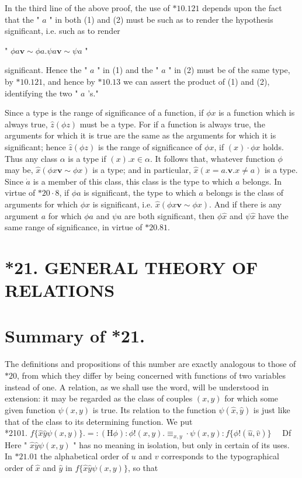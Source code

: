\documentclass[10pt]{article}
\begin{document}
In the third line of the above proof, the use of $* 10.121$ depends upon the fact that the " $a$ " in both (1) and (2) must be such as to render the hypothesis significant, i.e. such as to render

\begin{displayquote}
" $\phi a \mathbf{v} \sim \phi a . \psi a \mathbf{v} \sim \psi a$ "
\end{displayquote}

significant. Hence the " $a$ " in (1) and the " $a$ " in (2) must be of the same type, by $* 10.121$, and hence by $* 10.13$ we can assert the product of (1) and (2), identifying the two " $a$ 's."

Since a type is the range of significance of a function, if $\phi x$ is a function which is always true, $\hat{z}(\phi z)$ must be a type. For if a function is always true, the arguments for which it is true are the same as the arguments for which it is significant; hence $\hat{z}(\phi z)$ is the range of significance of $\phi x$, if $(x) \cdot \phi x$ holds. Thus any class $\alpha$ is a type if $(x) . x \in \alpha$. It follows that, whatever function $\phi$ may be, $\hat{x}(\phi x \mathbf{v} \sim \phi x)$ is a type; and in particular, $\hat{x}(x=a . \mathbf{v} . x \neq a)$ is a type. Since $\dot{a}$ is a member of this class, this class is the type to which $a$ belongs. In virtue of $* 20 \cdot 8$, if $\phi a$ is significant, the type to which $a$ belongs is the class of arguments for which $\phi x$ is significant, i.e. $\hat{x}(\phi x \mathbf{v} \sim \phi x)$. And if there is any argument $a$ for which $\phi a$ and $\psi a$ are both significant, then $\phi \hat{x}$ and $\psi \hat{x}$ have the same range of significance, in virtue of $* 20.81$.

\section*{*21. GENERAL THEORY OF RELATIONS}
\section*{Summary of *21.}
The definitions and propositions of this number are exactly analogous to those of $* 20$, from which they differ by being concerned with functions of two variables instead of one. A relation, as we shall use the word, will be understood in extension: it may be regarded as the class of couples $(x, y)$ for which some given function $\psi(x, y)$ is true. Its relation to the function $\psi(\hat{x}, \hat{y})$ is just like that of the class to its determining function. We put\\
*2101. $f\{\hat{x} \hat{y} \psi(x, y)\} .=:(\mathrm{H} \phi): \phi!(x, y) . \equiv_{x, y} \cdot \psi(x, y): f\{\phi!(\hat{u}, \hat{v})\} \quad$ Df Here " $\hat{x} \hat{y} \psi(x, y)$ " has no meaning in isolation, but only in certain of its uses. In $* 21.01$ the alphabetical order of $u$ and $v$ corresponds to the typographical order of $\hat{x}$ and $\hat{y}$ in $f\{\hat{x} \hat{y} \psi(x, y)\}$, so that
\end{document}
